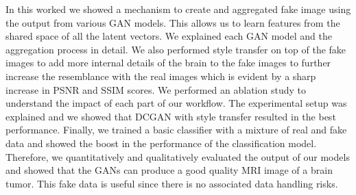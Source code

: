 \documentclass[10pt,journal,compsoc]{IEEEtran}
\begin{document}
In this worked we showed a mechanism to create and aggregated fake image using the output
from various GAN models. This allows us to learn features from the shared space of all the
latent vectors. We explained each GAN model and the aggregation process in detail. We also
performed style transfer on top of the fake images to add more internal details of the brain
to the fake images to further increase the resemblance with the real images which is evident
by a sharp increase in PSNR and SSIM scores. We performed an ablation study to understand
the impact of each part of our workflow. The experimental setup was explained and we showed
that DCGAN with style transfer resulted in the best performance. Finally, we trained a
basic classifier with a mixture of real and fake data and showed the boost in the 
performance of the classification model. Therefore, we quantitatively and qualitatively
evaluated the output of our models and showed that the GANs can produce a good quality
MRI image of a brain tumor. This fake data is useful since there is no associated data 
handling risks.



\end{document}
